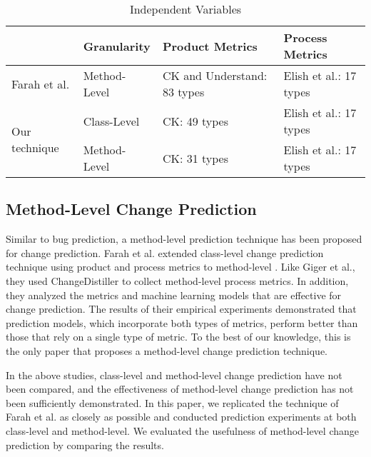 \begin{table*}[tb]\centering
    \caption{Independent Variables}\label{tab:metrics}
    \begin{tabular}{llll} \hline
         & Granularity & Product Metrics & Process Metrics \\ \hline
        Farah et al. & Method-Level & CK\cite{aniche-ck} and Understand: 83 types & Elish et al.\cite{elish-process}: 17 types \\
        \hline
        \multirow{2}{*}{Our technique} & Class-Level & CK\cite{aniche-ck}: 49 types & Elish et al.\cite{elish-process}: 17 types  \\
        & Method-Level & CK\cite{aniche-ck}: 31 types & Elish et al.\cite{elish-process}: 17 types \\
        \hline
    \end{tabular}
\end{table*}

\subsection{Method-Level Change Prediction}
Similar to bug prediction, a method-level prediction technique has been proposed for change prediction. 
Farah et al. extended class-level change prediction technique using product and process metrics to method-level \cite{farah-method-level}.
Like Giger et al., they used ChangeDistiller \cite{ChangeDistiller} to collect method-level process metrics. 
In addition, they analyzed the metrics and machine learning models that are effective for change prediction.
The results of their empirical experiments demonstrated that prediction models, which incorporate both types of metrics, perform better than those that rely on a single type of metric.
To the best of our knowledge, this is the only paper that proposes a method-level change prediction technique.

In the above studies, class-level and method-level change prediction have not been compared, and the effectiveness of method-level change prediction has not been sufficiently demonstrated. 
In this paper, we replicated the technique of Farah et al. as closely as possible and conducted prediction experiments at both class-level and method-level.
We evaluated the usefulness of method-level change prediction by comparing the results.